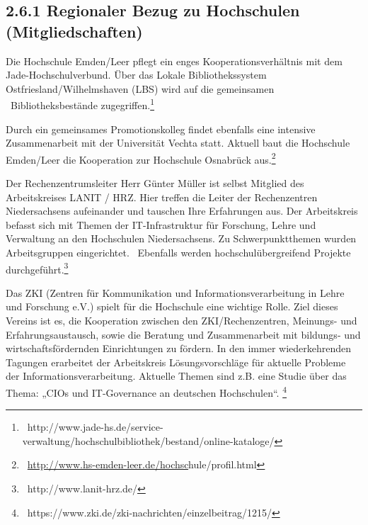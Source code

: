 \documentclass[a4paper]{article}
\newcommand\textstyleHyperlink[1]{\textcolor{blue}{#1}}
\begin{document}
\subsection[2.6.1 Regionaler Bezug zu Hochschulen (Mitgliedschaften)]{\bfseries 2.6.1 Regionaler Bezug zu Hochschulen
(Mitgliedschaften)}
{\sffamily\mdseries\color{black}
Die Hochschule Emden/Leer pflegt ein enges Kooperationsverhältnis mit dem Jade-Hochschulverbund. Über das Lokale
Bibliothekssystem Ostfriesland/Wilhelmshaven (LBS) wird auf die gemeinsamen \ Bibliotheksbestände
zugegriffen.\footnote{\textstyleHyperlink{\ }http://www.jade-hs.de/service-verwaltung/hochschulbibliothek/bestand/online-kataloge/}}


\bigskip

{\sffamily\mdseries\color{black}
Durch ein gemeinsames Promotionskolleg findet ebenfalls eine intensive Zusammenarbeit mit der Universität Vechta statt.
Aktuell baut die Hochschule Emden/Leer die Kooperation zur Hochschule Osnabrück
aus.\footnote{\textstyleHyperlink{\ }\href{http://www.hs-emden-leer.de/hochschule/profil.html}{http://www.hs-emden-leer.de/hochsc}hule/profil.html}}


\bigskip

{\sffamily\mdseries\color{black}
Der Rechenzentrumsleiter Herr Günter Müller ist selbst Mitglied des Arbeitskreises LANIT / HRZ. Hier treffen die Leiter
der Rechenzentren Niedersachsens aufeinander und tauschen Ihre Erfahrungen aus. Der Arbeitskreis befasst sich mit
Themen der IT-Infrastruktur für Forschung, Lehre und Verwaltung an den Hochschulen Niedersachsens. Zu Schwerpunktthemen
wurden Arbeitsgruppen eingerichtet. \ Ebenfalls werden hochschulübergreifend Projekte
durchgeführt.\footnote{\textstyleHyperlink{\ }http://www.lanit-hrz.de/}}


\bigskip

{\sffamily\mdseries\color{black}
Das ZKI (Zentren für Kommunikation und Informationsverarbeitung in Lehre und Forschung e.V.) spielt für die Hochschule
eine wichtige Rolle. Ziel dieses Vereins ist es, die Kooperation zwischen den ZKI/Rechenzentren, Meinungs- und
Erfahrungsaustausch, sowie die Beratung und Zusammenarbeit mit bildungs- und wirtschaftsfördernden Einrichtungen zu
fördern. In den immer wiederkehrenden Tagungen erarbeitet der Arbeitskreis Lösungsvorschläge für aktuelle Probleme der
Informationsverarbeitung. Aktuelle Themen sind z.B. eine Studie über das Thema: „CIOs und IT-Governance an deutschen
Hochschulen“. \footnote{\textstyleHyperlink{\ }https://www.zki.de/zki-nachrichten/einzelbeitrag/1215/}}
\end{document}
